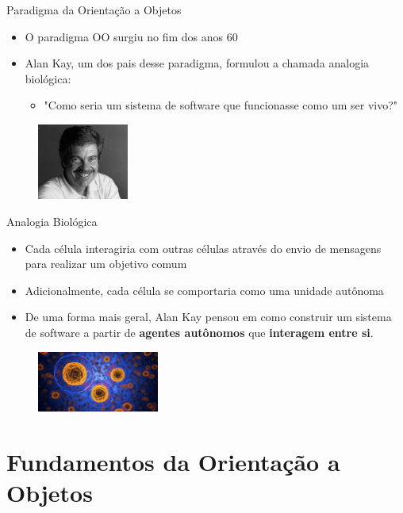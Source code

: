 \documentclass{beamer}
\begin{document}
\begin{frame}{Paradigma da Orientação a Objetos}
    \begin{itemize}
        \item O paradigma OO surgiu no fim dos anos 60
        \item Alan Kay, um dos pais desse paradigma, formulou a chamada analogia biológica:
        \begin{itemize}
            \item "Como seria um sistema de software que funcionasse como um ser vivo?"
        \end{itemize}
    \end{itemize}
    \begin{figure}
        \includegraphics[width=3cm]{Theme/Logos/alan_kay.png}
    \end{figure}
\end{frame}

\begin{frame}{Analogia Biológica}
    \begin{itemize}
        \item Cada célula interagiria com outras células através do envio de mensagens para realizar um objetivo comum
        \item Adicionalmente, cada célula se comportaria como uma unidade autônoma
        \item De uma forma mais geral, Alan Kay pensou em como construir um sistema de software a partir de \textbf{agentes autônomos} que \textbf{interagem entre si}.
    \end{itemize}
    \begin{figure}
        \includegraphics[width=4cm]{Theme/Logos/celula.png}
    \end{figure}
\end{frame}

\section{Fundamentos da Orientação a Objetos}
\end{document}
